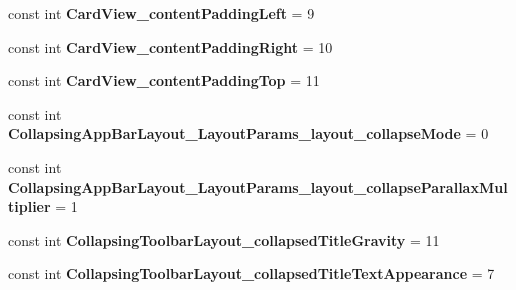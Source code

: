 \begin{DoxyCompactItemize}
\item 
\mbox{\label{class_sample_app_1_1_droid_1_1_resource_1_1_styleable_a89d08fed0a3898930197df56942b0ddb}} 
const int {\bfseries Card\+View\+\_\+content\+Padding\+Left} = 9
\item 
\mbox{\label{class_sample_app_1_1_droid_1_1_resource_1_1_styleable_a1acaeda1b4cf9fbbe0e0011197de1687}} 
const int {\bfseries Card\+View\+\_\+content\+Padding\+Right} = 10
\item 
\mbox{\label{class_sample_app_1_1_droid_1_1_resource_1_1_styleable_a06dba774372b668030ed9aeb8730c8aa}} 
const int {\bfseries Card\+View\+\_\+content\+Padding\+Top} = 11
\item 
\mbox{\label{class_sample_app_1_1_droid_1_1_resource_1_1_styleable_a8cdada48619a6cac64da2d3ab972edde}} 
const int {\bfseries Collapsing\+App\+Bar\+Layout\+\_\+\+Layout\+Params\+\_\+layout\+\_\+collapse\+Mode} = 0
\item 
\mbox{\label{class_sample_app_1_1_droid_1_1_resource_1_1_styleable_a28d1d25af88fbd69c31b4383a08d214d}} 
const int {\bfseries Collapsing\+App\+Bar\+Layout\+\_\+\+Layout\+Params\+\_\+layout\+\_\+collapse\+Parallax\+Multiplier} = 1
\item 
\mbox{\label{class_sample_app_1_1_droid_1_1_resource_1_1_styleable_a6041a99842b5efc9b472af6fa298af5d}} 
const int {\bfseries Collapsing\+Toolbar\+Layout\+\_\+collapsed\+Title\+Gravity} = 11
\item 
\mbox{\label{class_sample_app_1_1_droid_1_1_resource_1_1_styleable_a53abada893390c3138429e3de5f0782c}} 
const int {\bfseries Collapsing\+Toolbar\+Layout\+\_\+collapsed\+Title\+Text\+Appearance} = 7
\item 
\mbox{\label{class_sample_app_1_1_droid_1_1_resource_1_1_styleable_a5b5d2856fc879a8c6fedd8102934c5c1}} 

\end{DoxyCompactItemize}
